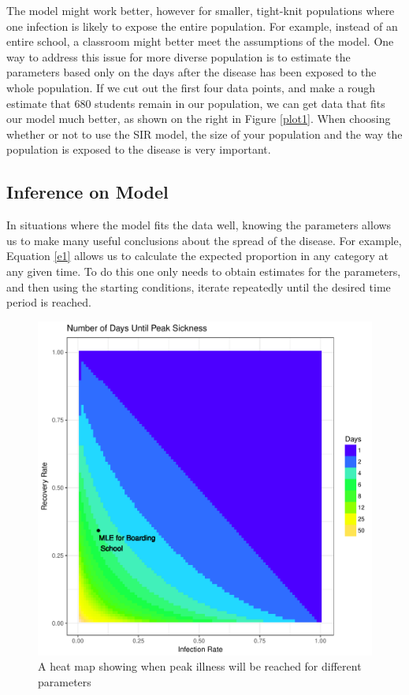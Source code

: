\documentclass{svproc}
\begin{document}
The model might work better, however for smaller, tight-knit populations where one infection is likely to expose the entire population. For example, instead of an entire school, a classroom might better meet the assumptions of the model. One way to address this issue for more diverse population is to estimate the parameters based only on the days after the disease has been exposed to the whole population. If we cut out the first four data points, and make a rough estimate that 680 students remain in our population, we can get data that fits our model much better, as shown on the right in Figure \ref{plot1}. When choosing whether or not to use the SIR model, the size of your population and the way the population is exposed to the disease is very important.



\subsection*{Inference on Model}

In situations where the model fits the data well, knowing the parameters allows us to make many useful conclusions about the spread of the disease. For example, Equation \eqref{e1} allows us to calculate the expected proportion in any category at any given time. To do this one only needs to obtain estimates for the parameters, and then using the starting conditions, iterate repeatedly until the desired time period is reached. %
\begin{figure}
\centering
\includegraphics[scale=.7]{DayGrid.pdf}
\caption{A heat map showing when peak illness will be reached for different parameters}
\label{plot2}
\end{figure}
\end{document}
